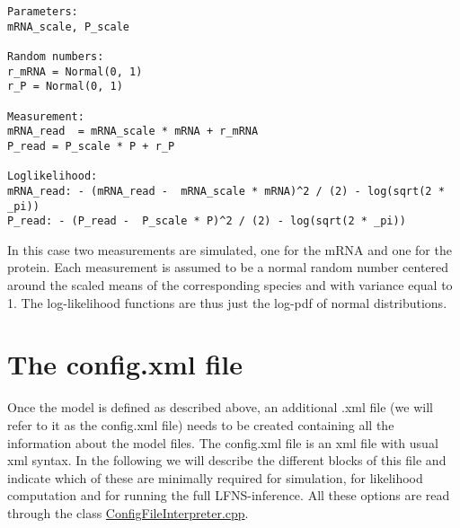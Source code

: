 \documentclass[11pt]{article} %
\begin{document}
\begin{tcolorbox}
\begin{verbatim}
Parameters:
mRNA_scale, P_scale

Random numbers:
r_mRNA = Normal(0, 1)
r_P = Normal(0, 1)

Measurement:
mRNA_read  = mRNA_scale * mRNA + r_mRNA
P_read = P_scale * P + r_P

Loglikelihood:
mRNA_read: - (mRNA_read -  mRNA_scale * mRNA)^2 / (2) - log(sqrt(2 * _pi))
P_read: - (P_read -  P_scale * P)^2 / (2) - log(sqrt(2 * _pi))
\end{verbatim}
\end{tcolorbox}


In this case two measurements are simulated, one for the mRNA and one for the protein. Each measurement is assumed to be a normal random number centered around the scaled means of the corresponding species and with variance equal to 1. The log-likelihood functions are thus just the log-pdf of normal distributions.

\part{The config.xml file}
Once the model is defined as described above, an additional  .xml file (we will refer to it as the config.xml file) needs to be created containing all the information about the model files. The config.xml file is an xml file with usual xml syntax. In the following we will describe the different blocks of this file and indicate which of these are minimally required for simulation, for likelihood computation and for running the full LFNS-inference. All these options are read through the class \href{https://github.com/Mijan/LFNS/blob/publishable/src/io/ConfigFileInterpreter.cpp}{ConfigFileInterpreter.cpp}.
\end{document}
